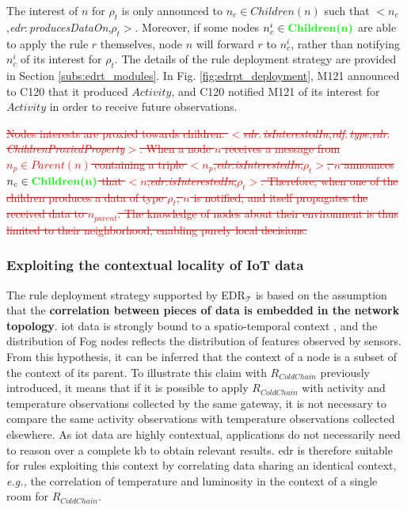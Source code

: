 \documentclass{iosart2c}
\newcommand{\edrt}{EDR$_{\mathcal{T}}$\xspace}
\newcommand{\added}[1]{\textcolor{green}{\textbf{#1}}}
\newcommand{\removed}[1]{\textcolor{red}{\sout{#1}}}
\newcommand{\namespace}[1]{\textit{#1$:$}}
\newcommand{\concept}[2]{\namespace{#1}\-\textit{#2}}
\newcommand{\triplet}[3]{$<$#1,\textit{#2},#3$>$}
\begin{document}
The interest of $n$ for $\rho_t$ is only announced to $n_c\in Children(n)$ such that \triplet{$n_c$}{\concept{edr}{produces\-Data\-On}}{$\rho_t$}.
Moreover, if some nodes $n^i_{c}\in \added{Children(n)}$ are able to apply the rule $r$ themselves, node $n$ will forward $r$ to $n^i_{c}$, rather than notifying $n^i_{c}$ of its interest for $\rho_t$.
The details of the rule deployment strategy are provided in Section \textsection \ref{subs:edrt_modules}.
In Fig. \ref{fig:edrpt_deployment}, M121 announced to C120 that it produced $Activity$, and C120 notified M121 of its interest for $Activity$ in order to receive future observations.

\removed{
Nodes interests are proxied towards children: \triplet{\concept{edr}{is\-Interested\-In}}{\concept{rdf}{type}}{\concept{edr}{Children\-Proxied\-Property}}.
When a node $n$ receives a message from $n_{p}\in Parent(n)$ containing a triple \triplet{$n_{p}$}{edr:is\-Interested\-In}{$\rho_t$}, $n$ announces $n_{c}\in \added{Children(n)}$ that \triplet{$n$}{edr:is\-Interested\-In}{$\rho_t$}.
Therefore, when one of the children produces a data of type $\rho_t$, $n$ is notified, and itself propagates the received data to $n_{parent}$.
The knowledge of nodes about their environment is thus limited to their neighborhood, enabling purely local decisions.}

\subsubsection{Exploiting the contextual locality of IoT data}
\label{subsubs:topology_rules}

The rule deployment strategy supported by \edrt is based on the assumption that the \textbf{correlation between pieces of data is embedded in the network topology}. 
\gls{iot} data is strongly bound to a spatio-temporal context \cite{Perera2014_context}, and the distribution of Fog nodes reflects the distribution of features observed by sensors.
From this hypothesis, it can be inferred that the context of a node is a subset of the context of its parent.
To illustrate this claim with $R_{ColdChain}$ previously introduced, it means that if it is possible to apply $R_{ColdChain}$ with activity and temperature observations collected by the same gateway, it is not necessary to compare the same activity observations with temperature observations collected elsewhere.
As \gls{iot} data are highly contextual, applications do not necessarily need to reason over a complete \gls{kb} to obtain relevant results.
\gls{edr} is therefore suitable for rules exploiting this context by correlating data sharing an identical context, \textit{e.g.,} the correlation of temperature and luminosity in the context of a single room for $R_{ColdChain}$.
\end{document}
